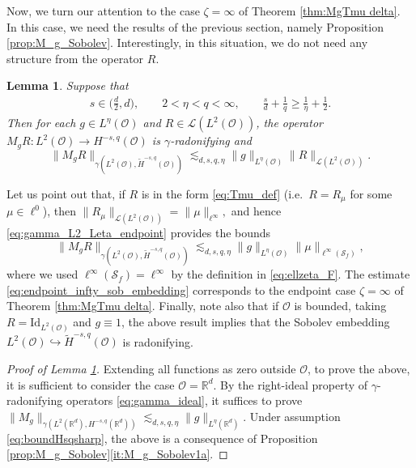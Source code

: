 \documentclass[reqno]{amsart}
\theoremstyle{plain}
\theoremstyle{remark}
\theoremstyle{plain}
\newtheorem{lemma}[theorem]{Lemma}
\numberwithin{equation}{section}
\newcommand\calL{\mathcal{L}}
\def\R{{\mathbb R}}
\newcommand{\Domm}{\mathcal{O}}
\newcommand{\wt}{\widetilde}
\newcommand{\1}{\one}
\renewcommand{\S}{\mathcal{S}}
\begin{document}
\smallskip

Now, we turn our attention to the case $\zeta=\infty$ of Theorem \ref{thm:MgTmu delta}. In this case, we need the results of the previous section, namely Proposition \ref{prop:M_g_Sobolev}.
Interestingly, in this situation, we do not need any structure from the operator $R$.

\begin{lemma}
\label{lem:zetainfty}
Suppose that
\begin{align}
\label{eq:boundHsqsharp}
s\in \Big(\frac{d}{2},d\Big), 
\qquad 2<\eta<q<\infty, \qquad   \frac{s}{d} + \frac{1}{q} \geq \frac{1}{\eta}+\frac{1}{2}. 
\end{align}
Then for each $g\in L^{\eta}(\mathcal{O})$ and $R\in \calL(L^2(\mathcal{O}))$, the operator $M_g R:L^2(\mathcal{O})\to H^{-s,q}(\mathcal{O})$ is $\gamma$-radonifying and 
\begin{equation}
\label{eq:gamma_L2_Leta_endpoint}
\|M_g R\|_{\gamma(L^2(\mathcal{O}), \wt{H}^{-s,q}(\mathcal{O}))}\lesssim_{d,s,q,\eta} \|g\|_{L^\eta(\mathcal{O})} 
\|R\|_{\calL(L^2(\mathcal{O}))}.
\end{equation}
\end{lemma}

Let us point out that, if $R$ is in the form \eqref{eq:Tmu_def} (i.e.\ $R=R_\mu$ for some $\mu\in \ell^0$), then 
$
\|R_\mu\|_{\calL(L^2(\mathcal{O}))}=\|\mu\|_{\ell^\infty},
$
and hence \eqref{eq:gamma_L2_Leta_endpoint} provides the bounds 
\begin{equation}
\label{eq:endpoint_infty_sob_embedding}
\|M_g R\|_{\gamma(L^2(\mathcal{O}), \wt{H}^{-s,q}(\mathcal{O}))}\lesssim_{d,s,q,\eta}\|g\|_{L^\eta(\mathcal{O})} \|\mu\|_{\ell^\infty(\S_f)},
\end{equation} 
where we used $\ell^\infty(\S_f) =\ell^\infty$ by the definition in \eqref{eq:ellzeta_F}.
The estimate \eqref{eq:endpoint_infty_sob_embedding} corresponds to the endpoint case $\zeta=\infty$ of Theorem \ref{thm:MgTmu delta}. Finally, note also that if $\mathcal{O}$ is bounded, taking  $R = \mathrm{Id}_{L^2(\Domm)}$ and $g\equiv 1$, the above result implies that the Sobolev embedding $L^2(\mathcal{O})\hookrightarrow \wt{H}^{-s,q}(\mathcal{O})$ is radonifying.

\begin{proof}[Proof of Lemma \ref{lem:zetainfty}]
Extending all functions as zero outside $\mathcal{O}$, to prove the above, it is sufficient to consider the case $\mathcal{O} = \R^d$. 
By the right-ideal property of $\gamma$-radonifying operators  \eqref{eq:gamma_ideal}, it suffices to prove $\|M_g\|_{\gamma(L^2(\R^d),H^{-s,q}(\R^d))}\lesssim_{d,s,q,\eta} \|g\|_{L^\eta(\R^d)}$. 
Under assumption \eqref{eq:boundHsqsharp}, the above is a consequence of Proposition \ref{prop:M_g_Sobolev}\eqref{it:M_g_Sobolev1a}.
\end{proof}  
\end{document}
